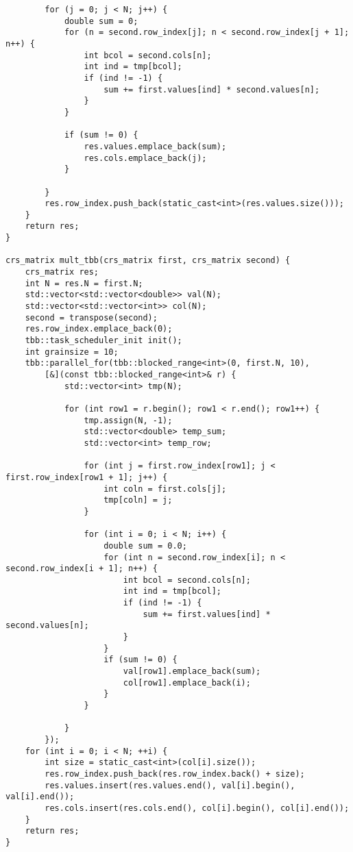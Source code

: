 \documentclass{report}
\begin{document}
\begin{lstlisting}
        for (j = 0; j < N; j++) {
            double sum = 0;
            for (n = second.row_index[j]; n < second.row_index[j + 1]; n++) {
                int bcol = second.cols[n];
                int ind = tmp[bcol];
                if (ind != -1) {
                    sum += first.values[ind] * second.values[n];
                }
            }

            if (sum != 0) {
                res.values.emplace_back(sum);
                res.cols.emplace_back(j);
            }

        }
        res.row_index.push_back(static_cast<int>(res.values.size()));
    }
    return res;
}

crs_matrix mult_tbb(crs_matrix first, crs_matrix second) {
    crs_matrix res;
    int N = res.N = first.N;
    std::vector<std::vector<double>> val(N);
    std::vector<std::vector<int>> col(N);
    second = transpose(second);
    res.row_index.emplace_back(0);
    tbb::task_scheduler_init init();
    int grainsize = 10;
    tbb::parallel_for(tbb::blocked_range<int>(0, first.N, 10),
        [&](const tbb::blocked_range<int>& r) {
            std::vector<int> tmp(N);

            for (int row1 = r.begin(); row1 < r.end(); row1++) {
                tmp.assign(N, -1);
                std::vector<double> temp_sum;
                std::vector<int> temp_row;

                for (int j = first.row_index[row1]; j < first.row_index[row1 + 1]; j++) {
                    int coln = first.cols[j];
                    tmp[coln] = j;
                }

                for (int i = 0; i < N; i++) {
                    double sum = 0.0;
                    for (int n = second.row_index[i]; n < second.row_index[i + 1]; n++) {
                        int bcol = second.cols[n];
                        int ind = tmp[bcol];
                        if (ind != -1) {
                            sum += first.values[ind] * second.values[n];
                        }
                    }
                    if (sum != 0) {
                        val[row1].emplace_back(sum);
                        col[row1].emplace_back(i);
                    }
                }

            }
        });
    for (int i = 0; i < N; ++i) {
        int size = static_cast<int>(col[i].size());
        res.row_index.push_back(res.row_index.back() + size);
        res.values.insert(res.values.end(), val[i].begin(), val[i].end());
        res.cols.insert(res.cols.end(), col[i].begin(), col[i].end());
    }
    return res;
}

\end{lstlisting}
\end{document}
